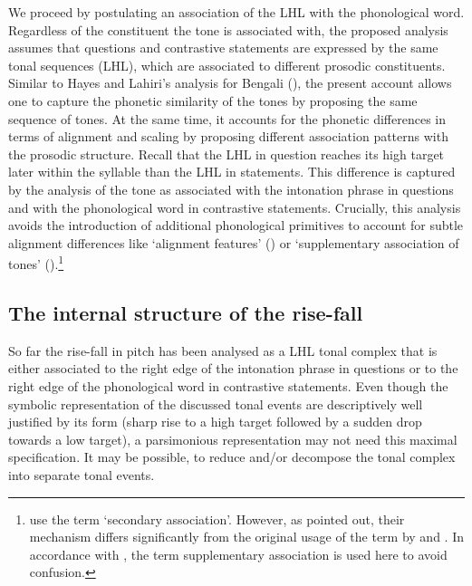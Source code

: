 We proceed by postulating an association of the LHL with the phonological word. Regardless of the constituent the tone is associated with, the proposed analysis assumes that questions and contrastive statements are expressed by the same tonal sequences (LHL), which are associated to different prosodic constituents. Similar to Hayes and Lahiri’s analysis for Bengali (\citeyear{HayesLahiri1991}), the present account allows one to capture the phonetic similarity of the tones by proposing the same sequence of tones. At the same time, it accounts for the phonetic differences in terms of alignment and scaling by proposing different association patterns with the prosodic structure. Recall that the LHL in question reaches its high target later within the syllable than the LHL in statements. This difference is captured by the analysis of the tone as associated with the intonation phrase in questions and with the phonological word in contrastive statements. Crucially, this analysis avoids the introduction of additional phonological primitives to account for subtle alignment differences like ‘alignment features’ (\citealt{Remijsen2013}) or ‘supplementary association of tones’ (\citealt{Prieto.etal2005,FacePrieto2007}).\footnote{\citet{Prieto.etal2005} use the term ‘secondary association’. However, as \citet{Arvaniti.etal2006} pointed out, their mechanism differs significantly from the original usage of the term by \citet{PierrBeck1988} and \citet{Grice.etal2000}. In accordance with \citet{Arvaniti.etal2006}, the term supplementary association is used here to avoid confusion.}

\largerpage[-1]
\subsection{The internal structure of the rise-fall}
So far the rise-fall in pitch has been analysed as a LHL tonal complex that is either associated to the right edge of the intonation phrase in questions or to the right edge of the phonological word in contrastive statements. Even though the symbolic representation of the discussed tonal events are descriptively well justified by its form (sharp rise to a high target followed by a sudden drop towards a low target), a parsimonious representation may not need this maximal specification. It may be possible, to reduce and/or decompose the tonal complex into separate tonal events. 

